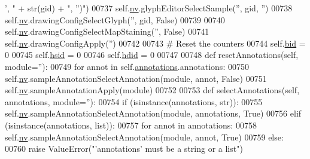 \begin{DoxyCode}
{      ', "} + str(gid) + \textcolor{stringliteral}{", '')"})
00737             self.\hyperlink{classnavicom_1_1navicom_1_1NaviCom_af740fe52f9f3cfc076ae88ca696bd05e}{nv}.glyphEditorSelectSample(\textcolor{stringliteral}{''}, gid, \textcolor{stringliteral}{''})
00738             self.\hyperlink{classnavicom_1_1navicom_1_1NaviCom_af740fe52f9f3cfc076ae88ca696bd05e}{nv}.drawingConfigSelectGlyph(\textcolor{stringliteral}{''}, gid, \textcolor{keyword}{False})
00739         
00740         self.\hyperlink{classnavicom_1_1navicom_1_1NaviCom_af740fe52f9f3cfc076ae88ca696bd05e}{nv}.drawingConfigSelectMapStaining(\textcolor{stringliteral}{''}, \textcolor{keyword}{False})
00741         self.\hyperlink{classnavicom_1_1navicom_1_1NaviCom_af740fe52f9f3cfc076ae88ca696bd05e}{nv}.drawingConfigApply(\textcolor{stringliteral}{''})
00742 
00743         \textcolor{comment}{# Reset the counters}
00744         self.\hyperlink{classnavicom_1_1navicom_1_1NaviCom_a1f652094a5c16ca0b721856f5e5aadf2}{bid} = 0
00745         self.\hyperlink{classnavicom_1_1navicom_1_1NaviCom_ac8b826435d1ae69420151967b3a872eb}{hsid} = 0
00746         self.\hyperlink{classnavicom_1_1navicom_1_1NaviCom_a35fe0d421abe7e1b08fc92ca58b689db}{hdid} = 0
00747 
00748     \textcolor{keyword}{def }resetAnnotations(self, module=''):
00749         \textcolor{keywordflow}{for} annot \textcolor{keywordflow}{in} self.\hyperlink{classnavicom_1_1navicom_1_1NaviCom_a0386d881214943cf3432d0ffe22cbb71}{annotations}.annotations:
00750             self.\hyperlink{classnavicom_1_1navicom_1_1NaviCom_af740fe52f9f3cfc076ae88ca696bd05e}{nv}.sampleAnnotationSelectAnnotation(module, annot, \textcolor{keyword}{False})
00751         self.\hyperlink{classnavicom_1_1navicom_1_1NaviCom_af740fe52f9f3cfc076ae88ca696bd05e}{nv}.sampleAnnotationApply(module)
00752 
00753     \textcolor{keyword}{def }selectAnnotations(self, annotations, module=''):
00754         \textcolor{keywordflow}{if} (isinstance(annotations, str)):
00755             self.\hyperlink{classnavicom_1_1navicom_1_1NaviCom_af740fe52f9f3cfc076ae88ca696bd05e}{nv}.sampleAnnotationSelectAnnotation(module, annotations, \textcolor{keyword}{True})
00756         \textcolor{keywordflow}{elif} (isinstance(annotations, list)):
00757             \textcolor{keywordflow}{for} annot \textcolor{keywordflow}{in} annotations:
00758                 self.\hyperlink{classnavicom_1_1navicom_1_1NaviCom_af740fe52f9f3cfc076ae88ca696bd05e}{nv}.sampleAnnotationSelectAnnotation(module, annot, \textcolor{keyword}{True})
00759         \textcolor{keywordflow}{else}:
00760             \textcolor{keywordflow}{raise} ValueError(\textcolor{stringliteral}{"'annotations' must be a string or a list"})

\end{DoxyCode}
